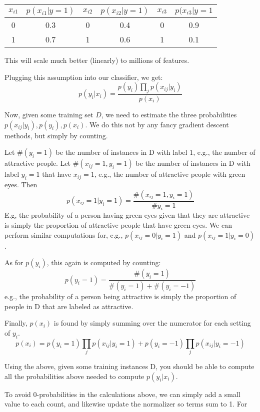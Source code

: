 \documentclass{article}
\begin{document}
\begin{tabular}{|c|c||c|c||c|c|}
\hline
$x_{i1}$ & $p(x_{i1}|y=1)$ & $x_{i2}$ & $p(x_{i2}|y=1)$ & $x_{i3}$ & $p(x_{i3}|y=1$\\
\hline
0 & 0.3 & 0 & 0.4 & 0 & 0.9\\
1 & 0.7 & 1 & 0.6 & 1 & 0.1\\
\hline
\end{tabular}

This will scale much better (linearly) to millions of features.

Plugging this assumption into our classifier, we get:
$$
p(y_i|x_i) = \frac{p(y_i)\prod_j p(x_{ij}|y_i)}{p(x_i)}
$$

Now, given some training set $D$, we need to estimate the three probabilities $p(x_{ij}|y_i), p(y_i), p(x_i)$. We do this not by any fancy gradient descent methods, but simply by counting.

\vspace{.1in}



Let $\#(y_i=1)$ be the number of instances in D with label $1$, e.g., the number of attractive people. Let $\#(x_{ij}=1, y_i=1)$ be the number of instances in D with label $y_i=1$ that have $x_{ij}=1$, e.g., the number of attractive people with green eyes. Then
$$
p(x_{ij}=1 | y_i = 1) = \frac{\#(x_{ij}=1, y_i=1)}{\# y_i=1}
$$ E.g, the probability of a person having green eyes given that they
are attractive is simply the proportion of attractive people that have
green eyes. We can perform similar computations for, e.g., $p(x_{ij}=0|y_i=1)$ and $p(x_{ij}=1|y_i=0)$.

As for $p(y_i)$, this again is computed by counting:
$$
p(y_i=1) = \frac{\#(y_i=1)}{\#(y_i=1) + \#(y_i=-1)}
$$
e.g., the probability of a person being attractive is simply the proportion of people in D that are labeled as attractive.

Finally, $p(x_i)$ is found by simply summing over the numerator for each setting of $y_i$.
$$
p(x_i) = p(y_i=1)\prod_j p(x_{ij}|y_i=1) + p(y_i=-1)\prod_j p(x_{ij}|y_i=-1) 
$$

Using the above, given some training instances D, you should be able to compute all the probabilities above needed to compute $p(y_i|x_i)$. 



To avoid 0-probabilities in the calculations above, we can simply add a small value to each count, and likewise update the normalizer so terms sum to 1. For 
\end{document}
